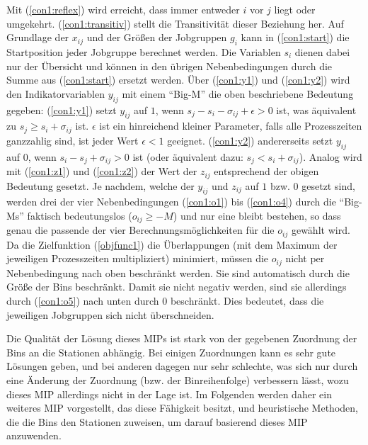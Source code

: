 \documentclass{scrreprt}
\begin{document}
Mit (\ref{con1:reflex}) wird erreicht, dass immer entweder $i$ vor $j$ liegt
oder umgekehrt. (\ref{con1:transitiv}) stellt die Transitivität dieser Beziehung
her. Auf Grundlage der $x_{ij}$ und der Größen der Jobgruppen $g_i$ 
kann in (\ref{con1:start}) die Startposition jeder Jobgruppe berechnet werden.
Die Variablen $s_i$ dienen dabei nur der Übersicht und können in den übrigen 
Nebenbedingungen durch die Summe aus (\ref{con1:start}) ersetzt werden.
Über (\ref{con1:y1}) und (\ref{con1:y2}) wird den Indikatorvariablen $y_{ij}$ 
mit einem "`Big-M"' die oben beschriebene Bedeutung gegeben:
(\ref{con1:y1}) setzt $y_{ij}$ auf $1$, wenn $s_j-s_i-\sigma_{ij}+\epsilon > 0$ ist,
was äquivalent zu $s_j \geq s_i+\sigma_{ij}$ ist.
$\epsilon$ ist ein hinreichend kleiner Parameter, falls alle Prozesszeiten ganzzahlig sind, ist jeder Wert $\epsilon<1$ geeignet.
(\ref{con1:y2}) andererseits setzt $y_{ij}$ auf $0$, wenn $s_i-s_j+\sigma_{ij} > 0$ ist (oder äquivalent dazu: $s_j < s_i+\sigma_{ij}$).
Analog wird mit (\ref{con1:z1}) und (\ref{con1:z2}) der Wert der $z_{ij}$ entsprechend der obigen Bedeutung gesetzt.
Je nachdem, welche der $y_{ij}$ und $z_{ij}$ auf $1$ bzw. $0$ gesetzt sind, 
werden drei der vier Nebenbedingungen (\ref{con1:o1}) bis (\ref{con1:o4}) durch die "`Big-Ms"' faktisch bedeutungslos ($o_{ij}\geq -M$)
und nur eine bleibt bestehen, so dass genau die passende der vier Berechnungsmöglichkeiten für die $o_{ij}$ gewählt wird.
Da die Zielfunktion (\ref{objfunc1}) die Überlappungen (mit dem Maximum der jeweiligen Prozesszeiten multipliziert) minimiert,
müssen die $o_{ij}$ nicht per Nebenbedingung nach oben beschränkt werden.
Sie sind automatisch durch die Größe der Bins beschränkt.
Damit sie nicht negativ werden, sind sie allerdings durch (\ref{con1:o5}) nach unten durch $0$ beschränkt.
Dies bedeutet, dass die jeweiligen Jobgruppen sich nicht überschneiden.

Die Qualität der Lösung dieses MIPs ist stark von der gegebenen Zuordnung der Bins an die Stationen abhängig.
Bei einigen Zuordnungen kann es sehr gute Lösungen geben, und bei anderen dagegen nur sehr schlechte, was sich nur durch eine
Änderung der Zuordnung (bzw. der Binreihenfolge) verbessern lässt, wozu dieses MIP allerdings nicht in der Lage ist.
Im Folgenden werden daher ein weiteres MIP vorgestellt, das diese Fähigkeit besitzt, und heuristische Methoden,
die die Bins den Stationen zuweisen, um darauf basierend dieses MIP anzuwenden.
\end{document}
